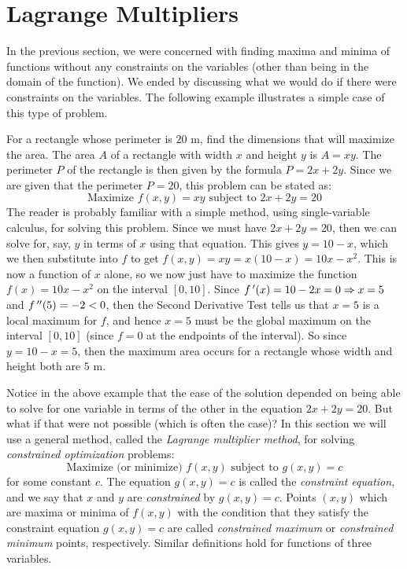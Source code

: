 \section{Lagrange Multipliers}\label{sec:lagrange}


In the previous section, we were concerned with finding maxima and minima of functions without any constraints on the variables (other than being in the domain of the function). We ended by discussing what we would do if there were constraints on the variables. The following example illustrates a simple case of this type of problem.

\begin{example}\label{exmp_consimple}%
For a rectangle whose perimeter is $20$ m, find the dimensions that will maximize the area.
\solution
The area $A$ of a rectangle with width $x$ and height $y$ is $A = xy$. The perimeter $P$ of the rectangle is then given by the formula $P = 2x + 2y$. Since we are given that the perimeter $P = 20$, this problem can be stated as:
\[\text{Maximize }f(x,y) = xy\text{ subject to }2x + 2y = 20\]
The reader is probably familiar with a simple method, using single-variable calculus, for solving this problem. Since we must have $2x+2y=20$, then we can solve for, say, $y$ in terms of $x$ using that equation. This gives $y = 10 - x$, which we then substitute into $f$ to get $f(x,y) = xy = x(10-x) = 10x - x^2$. This is now a function of $x$ alone, so we now just have to maximize the function $f(x) = 10x - x^2$ on the interval $[0,10]$. Since $f\,'(x) = 10-2x = 0 \Rightarrow x =5$ and $f\,''(5) = -2 < 0$, then the Second Derivative Test tells us that $x=5$ is a local maximum for $f$, and hence $x=5$ must be the global maximum on the interval $[0,10]$ (since $f = 0$ at the endpoints of the interval). So since $y=10-x =5$, then the maximum area occurs for a rectangle whose width and height both are $5$ m.
\end{example}


Notice in the above example that the ease of the solution depended on being able to solve for one variable in terms of the other in the equation $2x+2y=20$. But what if that were not possible (which is often the case)? In this section we will use a general method, called the \emph{Lagrange multiplier method}, for solving \emph{constrained optimization} problems:
\[
 \text{Maximize (or minimize) }f(x,y)\text{ subject to }g(x,y) = c
\]
for some constant $c$.
The equation $g(x,y) = c$ is called the \emph{constraint equation}, and we say that $x$ and $y$ are \emph{constrained} by $g(x,y) = c$. Points $(x,y)$ which are maxima or minima of $f(x,y)$ with the condition that they satisfy the constraint equation $g(x,y)=c$ are called \emph{constrained maximum} or \emph{constrained minimum} points, respectively. Similar definitions hold for functions of three variables.

